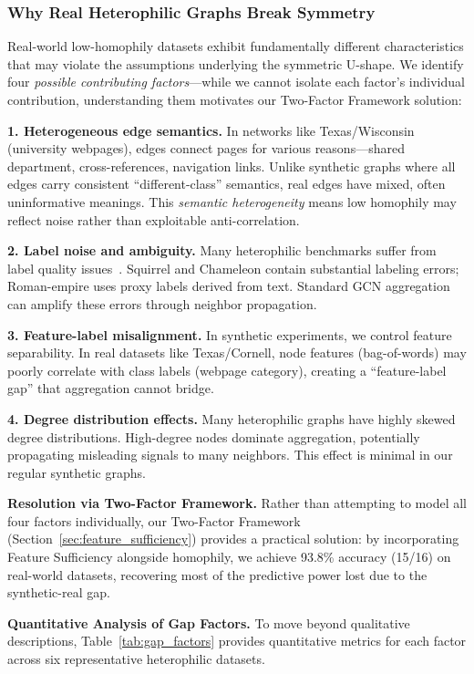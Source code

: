 \subsubsection{Why Real Heterophilic Graphs Break Symmetry}

Real-world low-homophily datasets exhibit fundamentally different characteristics that may violate the assumptions underlying the symmetric U-shape. We identify four \textit{possible contributing factors}---while we cannot isolate each factor's individual contribution, understanding them motivates our Two-Factor Framework solution:

\textbf{1. Heterogeneous edge semantics.} In networks like Texas/Wisconsin (university webpages), edges connect pages for various reasons---shared department, cross-references, navigation links. Unlike synthetic graphs where all edges carry consistent ``different-class'' semantics, real edges have mixed, often uninformative meanings. This \textit{semantic heterogeneity} means low homophily may reflect noise rather than exploitable anti-correlation.

\textbf{2. Label noise and ambiguity.} Many heterophilic benchmarks suffer from label quality issues~\cite{platonov2023heterophilous}. Squirrel and Chameleon contain substantial labeling errors; Roman-empire uses proxy labels derived from text. Standard GCN aggregation can amplify these errors through neighbor propagation.

\textbf{3. Feature-label misalignment.} In synthetic experiments, we control feature separability. In real datasets like Texas/Cornell, node features (bag-of-words) may poorly correlate with class labels (webpage category), creating a ``feature-label gap'' that aggregation cannot bridge.

\textbf{4. Degree distribution effects.} Many heterophilic graphs have highly skewed degree distributions. High-degree nodes dominate aggregation, potentially propagating misleading signals to many neighbors. This effect is minimal in our regular synthetic graphs.

\textbf{Resolution via Two-Factor Framework.} Rather than attempting to model all four factors individually, our Two-Factor Framework (Section~\ref{sec:feature_sufficiency}) provides a practical solution: by incorporating Feature Sufficiency alongside homophily, we achieve 93.8\% accuracy (15/16) on real-world datasets, recovering most of the predictive power lost due to the synthetic-real gap.

\textbf{Quantitative Analysis of Gap Factors.} To move beyond qualitative descriptions, Table~\ref{tab:gap_factors} provides quantitative metrics for each factor across six representative heterophilic datasets.

